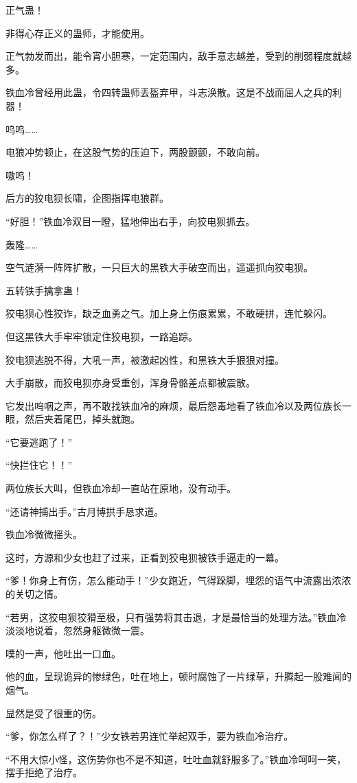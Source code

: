 \begin{this_body}
正气蛊！

非得心存正义的蛊师，才能使用。

正气勃发而出，能令宵小胆寒，一定范围内，敌手意志越差，受到的削弱程度就越多。

铁血冷曾经用此蛊，令四转蛊师丢盔弃甲，斗志涣散。这是不战而屈人之兵的利器！

呜呜……

电狼冲势顿止，在这股气势的压迫下，两股颤颤，不敢向前。

嗷呜！

后方的狡电狈长啸，企图指挥电狼群。

“好胆！”铁血冷双目一瞪，猛地伸出右手，向狡电狈抓去。

轰隆……

空气涟漪一阵阵扩散，一只巨大的黑铁大手破空而出，遥遥抓向狡电狈。

五转铁手擒拿蛊！

狡电狈心性狡诈，缺乏血勇之气。加上身上伤痕累累，不敢硬拼，连忙躲闪。

但这黑铁大手牢牢锁定住狡电狈，一路追踪。

狡电狈逃脱不得，大吼一声，被激起凶性，和黑铁大手狠狠对撞。

大手崩散，而狡电狈亦身受重创，浑身骨骼差点都被震散。

它发出呜咽之声，再不敢找铁血冷的麻烦，最后怨毒地看了铁血冷以及两位族长一眼，然后夹着尾巴，掉头就跑。

“它要逃跑了！”

“快拦住它！！”

两位族长大叫，但铁血冷却一直站在原地，没有动手。

“还请神捕出手。”古月博拱手恳求道。

铁血冷微微摇头。

这时，方源和少女也赶了过来，正看到狡电狈被铁手逼走的一幕。

“爹！你身上有伤，怎么能动手！”少女跑近，气得跺脚，埋怨的语气中流露出浓浓的关切之情。

“若男，这狡电狈狡猾至极，只有强势将其击退，才是最恰当的处理方法。”铁血冷淡淡地说着，忽然身躯微微一震。

噗的一声，他吐出一口血。

他的血，呈现诡异的惨绿色，吐在地上，顿时腐蚀了一片绿草，升腾起一股难闻的烟气。

显然是受了很重的伤。

“爹，你怎么样了？！”少女铁若男连忙举起双手，要为铁血冷治疗。

“不用大惊小怪，这伤势你也不是不知道，吐吐血就舒服多了。”铁血冷呵呵一笑，摆手拒绝了治疗。


\end{this_body}
